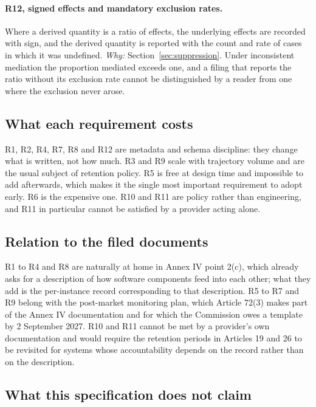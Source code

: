 \documentclass[11pt]{article}
\theoremstyle{remark}
\begin{document}
\paragraph{R12, signed effects and mandatory exclusion rates.} Where a derived
quantity is a ratio of effects, the underlying effects are recorded with sign, and
the derived quantity is reported with the count and rate of cases in which it was
undefined. \emph{Why:} Section~\ref{sec:suppression}. Under inconsistent mediation
the proportion mediated exceeds one, and a filing that reports the ratio without
its exclusion rate cannot be distinguished by a reader from one where the
exclusion never arose.

\subsection{What each requirement costs}

R1, R2, R4, R7, R8 and R12 are metadata and schema discipline: they change what is
written, not how much. R3 and R9 scale with trajectory volume and are the usual
subject of retention policy. R5 is free at design time and impossible to add
afterwards, which makes it the single most important requirement to adopt early.
R6 is the expensive one. R10 and R11 are policy rather than engineering, and R11
in particular cannot be satisfied by a provider acting alone.

\subsection{Relation to the filed documents}

R1 to R4 and R8 are naturally at home in Annex IV point 2(c), which already asks
for a description of how software components feed into each other; what they add
is the per-instance record corresponding to that description. R5 to R7 and R9
belong with the post-market monitoring plan, which Article 72(3) makes part of the
Annex IV documentation and for which the Commission owes a template by 2 September
2027. R10 and R11 cannot be met by a provider's own documentation and would
require the retention periods in Articles 19 and 26 to be revisited for systems
whose accountability depends on the record rather than on the description.

\subsection{What this specification does not claim}
\end{document}
